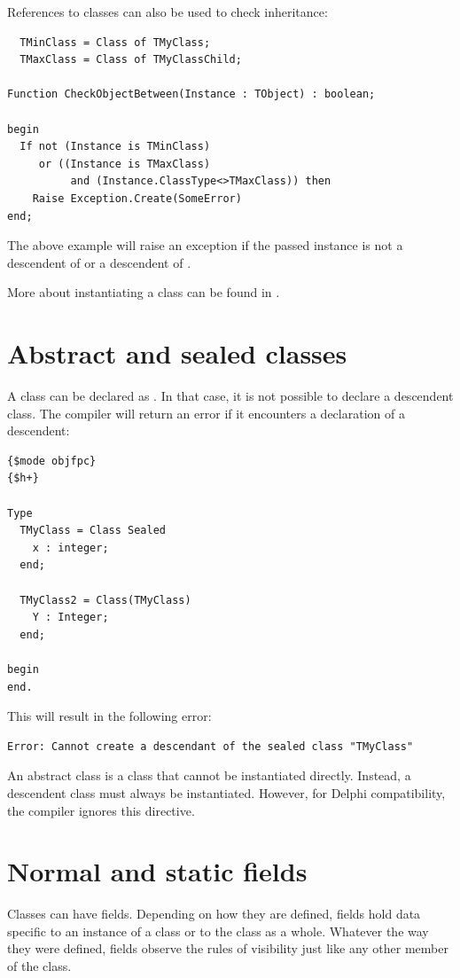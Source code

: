 References to classes can also be used to check inheritance:
\begin{verbatim}
  TMinClass = Class of TMyClass;
  TMaxClass = Class of TMyClassChild;

Function CheckObjectBetween(Instance : TObject) : boolean;

begin
  If not (Instance is TMinClass)
     or ((Instance is TMaxClass)
          and (Instance.ClassType<>TMaxClass)) then
    Raise Exception.Create(SomeError)
end;
\end{verbatim}
The above example will raise an exception if the passed instance
is not a descendent of  or a descendent of .

More about instantiating a class can be found in .

\section{Abstract and sealed classes}
A class can be declared as . In that case, it is not possible to
declare a descendent class. The compiler will return an error if it
encounters a declaration of a descendent:
\begin{verbatim}
{$mode objfpc}
{$h+}

Type
  TMyClass = Class Sealed
    x : integer;
  end;

  TMyClass2 = Class(TMyClass)
    Y : Integer;
  end;

begin
end.
\end{verbatim}
This will result in the following error:
\begin{verbatim}
Error: Cannot create a descendant of the sealed class "TMyClass"
\end{verbatim}

An abstract class is a class that cannot be instantiated directly. Instead,
a descendent class must always be instantiated.
However, for Delphi compatibility, the compiler ignores this directive.

\section{Normal and static fields}
\label{se:classfields}
Classes can have fields. Depending on how they are defined, fields hold data specific to
an instance of a class or to the class as a whole. Whatever the way they were defined,
fields observe the rules of visibility just like any other member of the class.

